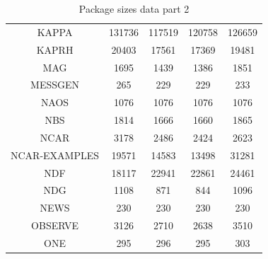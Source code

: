 \documentclass[twoside,11pt]{article}
\renewcommand{\_}{\texttt{\symbol{95}}}
\begin{document}
\begin{table}[p]
\begin{center}
\begin{tabular}{|c|c|c|c|c|}
KAPPA & 131736 & 117519 & 120758 & 126659 \\ 
KAPRH & 20403 & 17561 & 17369 & 19481 \\ 
MAG & 1695 & 1439 & 1386 & 1851 \\ 
MESSGEN & 265 & 229 & 229 & 233 \\ 
NAOS & 1076 & 1076 & 1076 & 1076 \\ 
NBS & 1814 & 1666 & 1660 & 1865 \\ 
NCAR & 3178 & 2486 & 2424 & 2623 \\ 
NCAR-EXAMPLES & 19571 & 14583 & 13498 & 31281 \\ 
NDF & 18117 & 22941 & 22861 & 24461 \\ 
NDG & 1108 & 871 & 844 & 1096 \\ 
NEWS & 230 & 230 & 230 & 230 \\ 
OBSERVE & 3126 & 2710 & 2638 & 3510 \\ 
ONE & 295 & 296 & 295 & 303 \\ 
\hline
\end{tabular}
\caption{Package sizes data part 2}
\end{center}
\end{table}
\end{document}
